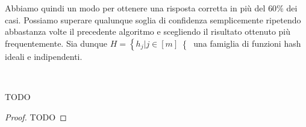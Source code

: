 Abbiamo quindi un modo per ottenere una risposta corretta in pi\`u del \(60\%\)
dei casi. Possiamo superare qualunque soglia di confidenza semplicemente
ripetendo abbastanza volte il precedente algoritmo e scegliendo il risultato
ottenuto pi\`u frequentemente. Sia dunque \(H = \left\{h_j | j\in[m]\right\{\) una
famiglia di funzioni hash ideali e indipendenti.
\begin{algorithm}
  \caption{}
  \begin{algorithmic}[1]
      \State \,
    \EndFor
  \end{algorithmic}
\end{algorithm}

\begin{lemma}
  TODO
\end{lemma}
\begin{proof}
  TODO
\end{proof}

